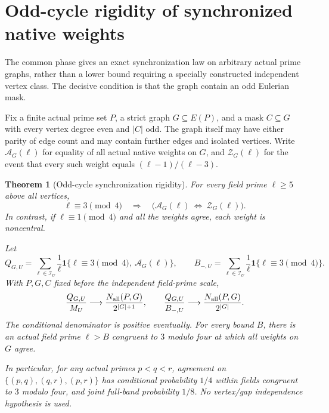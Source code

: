 \documentclass[11pt]{article}
\newtheorem{theorem}{Theorem}[section]
\begin{document}
\section{Odd-cycle rigidity of synchronized native weights}
\label{sec:native-odd-cycle-rigidity}

The common phase gives an exact synchronization law on arbitrary actual
prime graphs, rather than a lower bound requiring a specially constructed
independent vertex class. The decisive condition is that the graph
contain an odd Eulerian mask.

Fix a finite actual prime set \(P\), a strict graph \(G\subseteq E(P)\),
and a mask \(C\subseteq G\) with every vertex degree even and \(|C|\)
odd. The graph itself may have either parity of edge count and may
contain further edges and isolated vertices.
Write \(\mathcal A_G(\ell)\) for equality of all actual native weights
on \(G\), and \(\mathcal Z_G(\ell)\) for the event that every such weight
equals \((\ell-1)/(\ell-3)\).

\begin{theorem}[Odd-cycle synchronization rigidity]
\label{thm:native-odd-cycle-rigidity}
For every field prime \(\ell\geq5\) above all vertices,
\[
 \ell\equiv3\pmod4
 \quad\Longrightarrow\quad
       \bigl(\mathcal A_G(\ell)\ \Longleftrightarrow\
                                      \mathcal Z_G(\ell)\bigr).
\]
In contrast, if \(\ell\equiv1\pmod4\) and all the weights agree,
each weight is noncentral.

Let
\[
 Q_{G,U}=\sum_{\ell\in\mathcal I_U}\frac1\ell
       \mathbf1\{\ell\equiv3\pmod4,\ \mathcal A_G(\ell)\},
 \qquad
 B_{-,U}=\sum_{\ell\in\mathcal I_U}\frac1\ell
                                      \mathbf1\{\ell\equiv3\pmod4\}.
\]
With \(P,G,C\) fixed before the independent field-prime scale,
\begin{equation}\label{eq:native-odd-cycle-coincidence-law}
 \frac{Q_{G,U}}{M_U}\longrightarrow
          \frac{N_{\rm all}(P,G)}{2^{|G|+1}},
 \qquad
 \frac{Q_{G,U}}{B_{-,U}}\longrightarrow
          \frac{N_{\rm all}(P,G)}{2^{|G|}}.
\end{equation}
The conditional denominator is positive eventually.
For every bound \(B\), there is an actual field prime \(\ell>B\)
congruent to \(3\) modulo four at which all weights on \(G\) agree.

In particular, for any actual primes \(p<q<r\), agreement on
\(\{(p,q),(q,r),(p,r)\}\) has conditional probability \(1/4\) within
fields congruent to \(3\) modulo four, and joint full-band probability
\(1/8\). No vertex/gap independence hypothesis is used.
\end{theorem}
\end{document}
